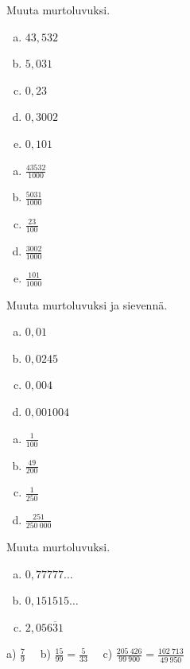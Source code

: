 \begin{tehtava}
Muuta murtoluvuksi.
	\begin{enumerate}[a)]
		\item $43{,}532$
		\item $5{,}031$
		\item $0{,}23$
		\item $0{,}3002$
		\item $0{,}101$
	\end{enumerate}
\begin{vastaus}
	\begin{enumerate}[a)]
		\item $ \frac{43532}{1000}$
		\item $ \frac{5031}{1000}$
		\item $ \frac{23}{100}$
		\item $ \frac{3002}{1000}$
		\item $ \frac{101}{1000}$
	\end{enumerate}
\end{vastaus}
\end{tehtava}

\begin{tehtava}%
Muuta murtoluvuksi ja sievennä.
	\begin{enumerate}[a)]
		\item $0{,}01$
		\item $0{,}0245$
		\item $0{,}004$
		\item $0{,}001004$
	\end{enumerate}
\begin{vastaus}
	\begin{enumerate}[a)]
		\item $ \frac{1}{100}$
		\item $ \frac{49}{200}$
		\item $ \frac{1}{250}$
		\item $ \frac{251}{250~000}$
	\end{enumerate}
\end{vastaus}
\end{tehtava}

\begin{tehtava}
Muuta murtoluvuksi.
	\begin{enumerate}[a)]
		\item $0,77777\ldots$
		\item $0,151515 \ldots$
		\item $2,05\overline{631}$
	\end{enumerate}
\begin{vastaus}
		a) $\frac{7}{9}$ \ \
		b) $\frac{15}{99}=\frac{5}{33}$ \ \
		c) $\frac{205\ 426}{99\ 900} = \frac{102\ 713}{49\ 950}$
	\end{vastaus}
\end{tehtava}

